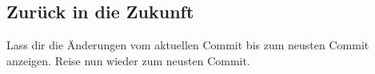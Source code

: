 \subsection{Zurück in die Zukunft}
Lass dir die Änderungen vom aktuellen Commit bis zum neusten Commit anzeigen.
Reise nun wieder zum neusten Commit.
